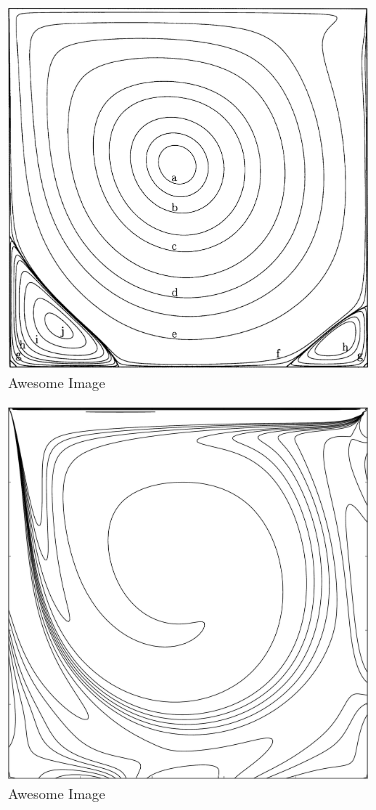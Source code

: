 \begin{figure}[p]
    \centering
    \includegraphics[width=0.85\textwidth]{Images/streamFunction.png}
    \caption{Awesome Image}
    \label{fig:awesome_image}
\end{figure}

\begin{figure}[p]
    \centering
    \includegraphics[width=0.85\textwidth]{Images/vorticity.pdf}
    \caption{Awesome Image}
    \label{fig:awesome_image}
\end{figure}

